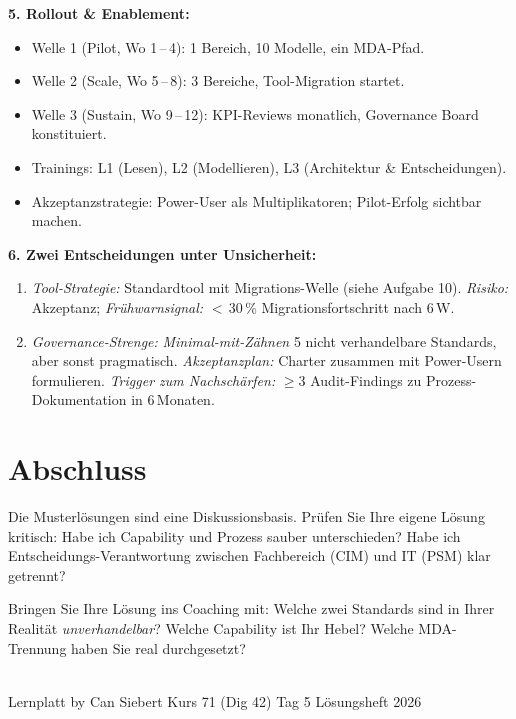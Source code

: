 \documentclass[11pt,a4paper,oneside]{article}
\begin{document}
\begin{loesungbox}
\smallskip
\textbf{5. Rollout \& Enablement:}
\begin{itemize}
  \item Welle 1 (Pilot, Wo 1\,--\,4): 1 Bereich, 10 Modelle, ein MDA-Pfad.
  \item Welle 2 (Scale, Wo 5\,--\,8): 3 Bereiche, Tool-Migration startet.
  \item Welle 3 (Sustain, Wo 9\,--\,12): KPI-Reviews monatlich, Governance Board konstituiert.
  \item Trainings: L1 (Lesen), L2 (Modellieren), L3 (Architektur \& Entscheidungen).
  \item Akzeptanzstrategie: Power-User als Multiplikatoren; Pilot-Erfolg sichtbar machen.
\end{itemize}

\smallskip
\textbf{6. Zwei Entscheidungen unter Unsicherheit:}
\begin{enumerate}
  \item \emph{Tool-Strategie:} Standardtool mit Migrations-Welle (siehe Aufgabe 10). \emph{Risiko:} Akzeptanz; \emph{Fr\"uhwarnsignal:} $<$\,30\,\% Migrationsfortschritt nach 6\,W.
  \item \emph{Governance-Strenge:} \emph{Minimal-mit-Z\"ahnen} \textendash{} 5 nicht verhandelbare Standards, aber sonst pragmatisch. \emph{Akzeptanzplan:} Charter zusammen mit Power-Usern formulieren. \emph{Trigger zum Nachsch\"arfen:} $\geq 3$ Audit-Findings zu Prozess-Dokumentation in 6\,Monaten.
\end{enumerate}
\end{loesungbox}

\clearpage

\section*{Abschluss}
\thispagestyle{plain}

\noindent Die Musterl\"osungen sind eine Diskussionsbasis. Pr\"ufen Sie Ihre eigene L\"osung kritisch: Habe ich Capability und Prozess sauber unterschieden? Habe ich Entscheidungs-Verantwortung zwischen Fachbereich (CIM) und IT (PSM) klar getrennt?

\medskip
\begin{infobox}
Bringen Sie Ihre L\"osung ins Coaching mit: Welche zwei Standards sind in Ihrer Realit\"at \emph{unverhandelbar}? Welche Capability ist Ihr Hebel? Welche MDA-Trennung haben Sie real durchgesetzt?
\end{infobox}

\vspace{1cm}
\noindent{\color{lpAccent}\rule{\linewidth}{0.6pt}}\\[4pt]
{\footnotesize\sffamily\color{lpGray}Lernplatt \textperiodcentered{} by Can Siebert \textperiodcentered{} Kurs 71 (Dig 42) \textperiodcentered{} Tag 5 \textperiodcentered{} L\"osungsheft \textperiodcentered{} \textcopyright{} 2026}
\end{document}
